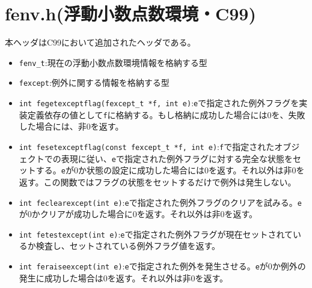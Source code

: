 \section{fenv.h(浮動小数点数環境・C99)}
本ヘッダはC99において追加されたヘッダである。
\begin{itemize}
\item \verb|fenv_t|:現在の浮動小数点数環境情報を格納する型
\item \verb|fexcept|:例外に関する情報を格納する型
\item \verb|int fegetexceptflag(fexcept_t *f, int e)|:\verb|e|で指定された例外フラグを実装定義依存の値として\verb|f|に格納する。もし格納に成功した場合には0を、失敗した場合には、非0を返す。
\item \verb|int fesetexceptflag(const fexcept_t *f, int e)|:\verb|f|で指定されたオブジェクトでの表現に従い、\verb|e|で指定された例外フラグに対する完全な状態をセットする。\verb|e|が0か状態の設定に成功した場合には0を返す。それ以外は非0を返す。この関数ではフラグの状態をセットするだけで例外は発生しない。
\item \verb|int feclearexcept(int e)|:\verb|e|で指定された例外フラグのクリアを試みる。\verb|e|が0かクリアが成功した場合に0を返す。それ以外は非0を返す。
\item \verb|int fetestexcept(int e)|:\verb|e|で指定された例外フラグが現在セットされているか検査し、セットされている例外フラグ値を返す。
\item \verb|int feraiseexcept(int e)|:\verb|e|で指定された例外を発生させる。\verb|e|が0か例外の発生に成功した場合は0を返す。それ以外は非0を返す。

\end{itemize}
